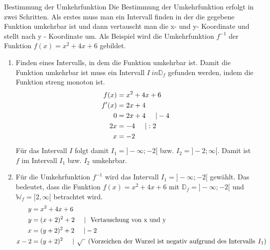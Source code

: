 \begin{b8d}{Bestimmung der Umkehrfunktion}{}
Die Bestimmung der Umkehrfunktion erfolgt in zwei Schritten. Als erstes muss man ein Intervall finden in der die gegebene Funktion umkehrbar ist und dann vertauscht man die x- und y- Koordinate und stellt nach y - Koordinate um. Als Beispiel wird die Umkehrfunktion $f^{-1}$ der Funktion $f(x) = x^2+4x+6$ gebildet.
\begin{enumerate}
    \item Finden eines Intervalls, in dem die Funktion umkehrbar ist. Damit die Funktion umkehrbar ist muss ein Intervall $I \ in \mathds{D}_f$ gefunden werden, indem die Funktion streng monoton ist.
    \begin{equation*}
        \begin{split}
            f(x)&= x^2+4x+6 \\
            f'(x)&= 2x+4\\
            0&= 2x+4 \hspace{0.5cm} | -4\\
            2x&= -4 \hspace{0.5cm} | :2\\
            x&= -2
        \end{split}
    \end{equation*}
    Für das Intervall $I$ folgt damit $I_1=]-\infty; -2[ $ bzw. $I_2 = ]-2;\infty[$. Damit ist $f$ im Intervall $I_1$ bzw. $I_2$ umkehrbar.
    \item Für die Umkehrfunktion $f^{-1}$ wird das Intervall $I_1 = ]-\infty; -2[$ gewählt. Das bedeutet, dass die Funktion $f(x) = x^2+4x+6$ mit $\mathds{D}_f = ]-\infty; -2[$ und $\mathds{W}_f = [2, \infty[$ betrachtet wird.
    \begin{equation*}
        \begin{split}
            y &= x^2+4x+6\\
            y &= (x+2)^2 +2 \hspace{0.5cm}| \hspace{0.25cm} \text{Vertauschung von x und y} \\
            x &= (y+2)^2+2 \hspace{0.5cm}| -2 \\
            x-2 &= (y+2)^2 \hspace{0.5cm}| \hspace{0.15cm}\sqrt{\hspace{0.15cm}} \hspace{0.15cm}\text{(Vorzeichen der Wurzel ist negativ aufgrund des Intervalls}\hspace{0.15cm} I_1)\\

\end{split}
\end{equation*}
\end{enumerate}
\end{b8d}
